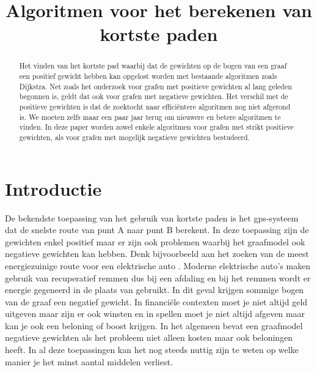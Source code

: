 \documentclass[conference]{IEEEtran}
\theoremstyle{definition}
\begin{document}
\title{Algoritmen voor het berekenen van kortste paden}

\author{
}

\maketitle
\pagestyle{plain}

\begin{abstract}
Het vinden van het kortste pad waarbij dat de gewichten op de bogen van een graaf een positief gewicht hebben kan opgelost worden met bestaande algoritmen zoals Dijkstra. Net zoals het onderzoek voor grafen met positieve gewichten al lang geleden begonnen is, geldt dat ook voor grafen met negatieve gewichten. Het verschil met de positieve gewichten is dat de zoektocht naar efficiëntere algoritmen nog niet afgerond is. We moeten zelfs maar een paar jaar terug om nieuwere en betere algoritmen te vinden. In deze paper worden zowel enkele algoritmen voor grafen met strikt positieve gewichten, als voor grafen met mogelijk negatieve gewichten bestudeerd.
\end{abstract}

\section*{Introductie}
De bekendste toepassing van het gebruik van kortste paden is het gps-systeem dat de snelste route van punt A naar punt B berekent. In deze toepassing zijn de gewichten enkel positief maar er zijn ook problemen waarbij het graafmodel ook negatieve gewichten kan hebben. Denk bijvoorbeeld aan het zoeken van de meest energiezuinige route voor een elektrische auto \cite{negatief}. Moderne elektrische auto's maken gebruik van recuperatief remmen dus bij een afdaling en bij het remmen wordt er energie gegeneerd in de plaats van gebruikt. In dit geval krijgen sommige bogen van de graaf een negatief gewicht. In financiële contexten moet je niet altijd geld uitgeven maar zijn er ook winsten en in spellen moet je niet altijd afgeven maar kan je ook een beloning of boost krijgen. In het algemeen bevat een graafmodel negatieve gewichten als het probleem niet alleen kosten maar ook beloningen heeft. In al deze toepassingen kan het nog steeds nuttig zijn te weten op welke manier je het minst aantal middelen verliest.
\end{document}
